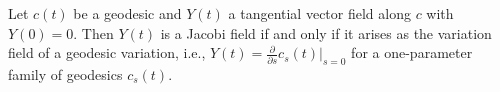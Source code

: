 Let $c(t)$ be a geodesic and $Y(t)$ a tangential vector field along $c$ with $Y(0) = 0$. Then $Y(t)$ is a Jacobi field if and only if it arises as the variation field of a geodesic variation, i.e., $Y(t) = \frac{\partial}{\partial s} c_s(t)|_{s=0}$ for a one-parameter family of geodesics $c_s(t)$.